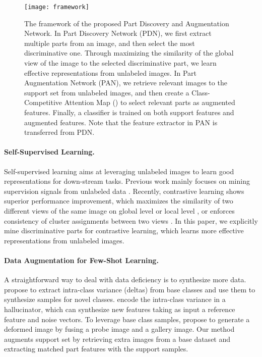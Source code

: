 \documentclass{article}
\begin{document}
\begin{figure*}[t]
    \centering
    \texttt{[image: framework]}
    \caption{The framework of the proposed Part Discovery and Augmentation Network. In Part Discovery Network (PDN), we first extract multiple parts from an image, and then select the most discriminative one. Through maximizing the similarity of the global view of the image to the selected discriminative part, we learn effective representations from unlabeled images. In Part Augmentation Network (PAN), we retrieve relevant images to the support set from unlabeled images, and then create a Class-Competitive Attention Map () to select relevant parts as augmented features. Finally, a classifier is trained on both support features and augmented features. Note that the feature extractor in PAN is transferred from PDN.}
    \label{fig:framework}
\end{figure*}





\paragraph{Self-Supervised Learning.} Self-supervised learning aims at leveraging unlabeled images to learn good representations for down-stream tasks. Previous work mainly focuses on mining supervision signals from unlabeled data \cite{gidaris2018unsupervised,Doersch2015UnsupervisedVR,Zhang2016ColorfulIC}. Recently, contrastive learning shows superior performance improvement, which maximizes the similarity of two different views of the same image on global level \cite{Chen2020ASF} or local level \cite{ouali2020spatial}, or enforces consistency of cluster assignments between two views \cite{Caron2020UnsupervisedLO}. In this paper, we explicitly mine discriminative parts for contrastive learning, which learns more effective representations from unlabeled images.

\paragraph{Data Augmentation for Few-Shot Learning.} A straightforward way to deal with data deficiency is to synthesize more data. \cite{NEURIPS2018_1714726c} propose to extract intra-class variance (deltas) from base classes and use them to synthesize samples for novel classes. \cite{wang2018low} encode the intra-class variance in a hallucinator, which can synthesize new features taking as input a reference feature and noise vectors. To leverage base class samples, \cite{Chen2019ImageDM} propose to generate a deformed image by fusing a probe image and a gallery image. 
Our method augments support set by retrieving extra images from a base dataset and extracting matched part features with the support samples.
\end{document}
